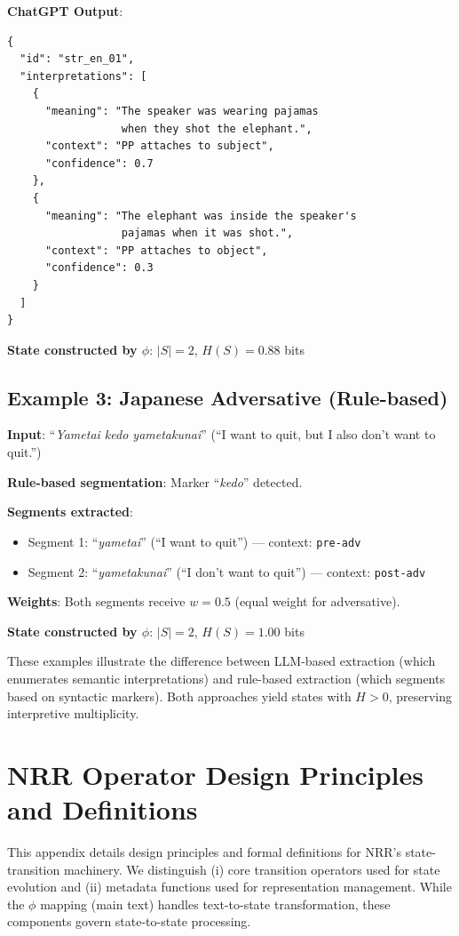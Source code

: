 \documentclass[11pt,a4paper]{article}
\begin{document}
\textbf{ChatGPT Output}:
\begin{verbatim}
{
  "id": "str_en_01",
  "interpretations": [
    {
      "meaning": "The speaker was wearing pajamas 
                  when they shot the elephant.",
      "context": "PP attaches to subject",
      "confidence": 0.7
    },
    {
      "meaning": "The elephant was inside the speaker's 
                  pajamas when it was shot.",
      "context": "PP attaches to object",
      "confidence": 0.3
    }
  ]
}
\end{verbatim}

\textbf{State constructed by $\phi$}: $|S| = 2$, $H(S) = 0.88$ bits

\subsection*{Example 3: Japanese Adversative (Rule-based)}

\textbf{Input}: ``\textit{Yametai kedo yametakunai}'' 
(``I want to quit, but I also don't want to quit.'')

\textbf{Rule-based segmentation}: Marker ``\textit{kedo}'' detected.

\textbf{Segments extracted}:
\begin{itemize}
    \item Segment 1: ``\textit{yametai}'' (``I want to quit'') --- context: \texttt{pre-adv}
    \item Segment 2: ``\textit{yametakunai}'' (``I don't want to quit'') --- context: \texttt{post-adv}
\end{itemize}

\textbf{Weights}: Both segments receive $w = 0.5$ (equal weight for adversative).

\textbf{State constructed by $\phi$}: $|S| = 2$, $H(S) = 1.00$ bits

\vspace{1em}
\noindent These examples illustrate the difference between LLM-based extraction 
(which enumerates semantic interpretations) and rule-based extraction (which 
segments based on syntactic markers). Both approaches yield states with $H > 0$, 
preserving interpretive multiplicity.

\section{NRR Operator Design Principles and Definitions}
\label{app:operators}

This appendix details design principles and formal definitions for NRR's
state-transition machinery. We distinguish (i) core transition operators
used for state evolution and (ii) metadata functions used for representation
management. While the $\phi$ mapping (main text) handles text-to-state
transformation, these components govern state-to-state processing.
\end{document}

